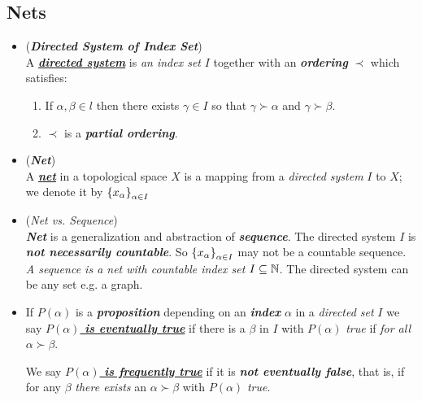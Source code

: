 \documentclass[11pt]{article}
\begin{document}
\subsection{Nets}
\begin{itemize}
\item \begin{definition} (\emph{\textbf{Directed System of Index Set}})\\
A \underline{\emph{\textbf{directed system}}} is \emph{an index set} $I$ together with an \emph{\textbf{ordering}} $\prec$ which satisfies:
\begin{enumerate}
\item If $\alpha, \beta \in l$ then there exists $\gamma \in I$ so that $\gamma \succ \alpha$ and $\gamma \succ \beta$.
\item $\prec$  is a \textbf{\emph{partial ordering}}.
\end{enumerate}
\end{definition}

\item \begin{definition} (\textbf{\emph{Net}})\\
A \underline{\emph{\textbf{net}}} in a topological space $X$ is a mapping from a \emph{directed system} $I$ to $X$; we denote it by $\left\{x_\alpha\right\}_{\alpha \in I}$
\end{definition}

\item \begin{remark} (\emph{Net vs. Sequence})\\
\emph{\textbf{Net}} is a generalization and abstraction of \emph{\textbf{sequence}}. The directed system $I$ is \emph{\textbf{not necessarily countable}}. So $\left\{x_\alpha\right\}_{\alpha \in I}$ may not be a countable sequence. \emph{A sequence is a net with countable index set $I \subseteq {\mathbb N}$}. The directed system can be any set e.g. a graph.
\end{remark}

\item \begin{definition}
If $P(\alpha)$ is a \emph{\textbf{proposition}} depending on an \emph{\textbf{index}} $\alpha$ in a \emph{directed set} $I$ we say \underline{\emph{\textbf{$P(\alpha)$ is eventually true}}} if there is a $\beta$ in $I$ with $P(\alpha)$ \emph{true} if \emph{for all} $\alpha \succ \beta$. 

We say \underline{\emph{\textbf{$P(\alpha)$ is frequently true}}} if it is \emph{\textbf{not eventually false}}, that is, if for any $\beta$ \emph{there exists} an $\alpha \succ \beta$ with $P(\alpha)$ \emph{true}.
\end{definition}


\end{itemize}
\end{document}
